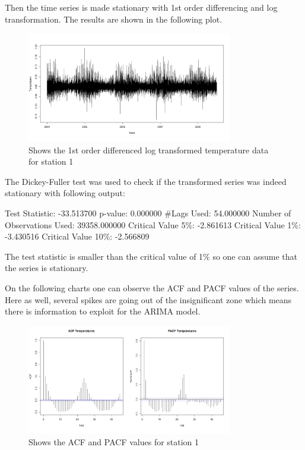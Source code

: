 \documentclass{article} %
\begin{document}
Then the time series is made stationary with 1st order differencing and log transformation. The results are shown in the following plot.

\begin{figure}
  \centering
    \includegraphics[width=0.80\textwidth]{TempStatData}
  \caption{Shows the 1st order differenced log transformed temperature data for station 1 }
\end{figure}

The Dickey-Fuller test was used to check if the transformed series was indeed stationary with following output:

Test Statistic: -33.513700
p-value: 0.000000
#Lags Used: 54.000000
Number of Observations Used: 39358.000000
Critical Value 5\%:  -2.861613
Critical Value 1\%: -3.430516
Critical Value 10\%: -2.566809

The test statistic is smaller than the critical value of 1\% so one can assume that the series is stationary.

On the following charts one can observe the ACF and PACF values of the series. Here as well, several spikes are going out of the insignificant zone which means there is information to exploit for the ARIMA model.

\begin{figure}
  \centering
    \includegraphics[width=0.80\textwidth]{ACFandPACFTempRaw}
  \caption{Shows the ACF and PACF values for station 1 }
\end{figure}
\end{document}

